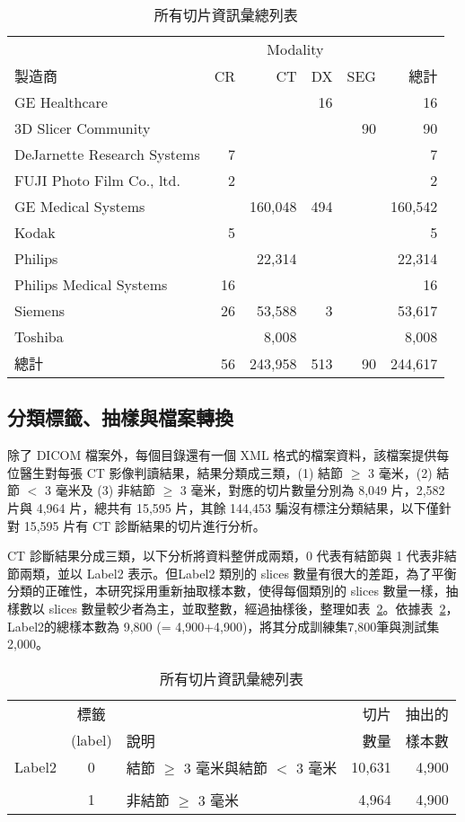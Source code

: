\documentclass[12pt, a4paper]{article} 				%
\begin{document}
\begin{table}[!ht]
\begin{center}
\caption{所有切片資訊彙總列表}\label{Table3-1}
\begin{tabular}{lrrrrr}\toprule
    &\multicolumn{4}{c}{Modality}\\
製造商	&	CR	&	CT	&	DX	&	SEG	&	總計	\\\midrule
GE Healthcare	&		&		&	16	&		&	16	\\
3D Slicer Community	&		&		&		&	90	&	90	\\
DeJarnette Research Systems	&	7	&		&		&		&	7	\\
FUJI Photo Film Co., ltd.	&	2	&		&		&		&	2	\\
GE Medical Systems	&		&	160,048	&	494	&		&	160,542	\\
Kodak	&	5	&		&		&		&	5	\\
Philips	&		&	22,314	&		&		&	22,314	\\
Philips Medical Systems	&	16	&		&		&		&	16	\\
Siemens	&	26	&	53,588	&	3	&		&	53,617	\\
Toshiba	&		&	8,008	&		&		&	8,008	\\
總計	&	56	&	243,958	&	513	&	90	&	244,617	\\\bottomrule
\end{tabular}
\end{center}
\end{table}

\subsection{分類標籤、抽樣與檔案轉換}
除了 DICOM 檔案外，每個目錄還有一個 XML 格式的檔案資料，該檔案提供每位醫生對每張 CT 影像判讀結果，結果分類成三類，(1) 結節 $\ge$ 3 毫米，(2) 結節 $<$ 3 毫米及 (3) 非結節 $\ge$ 3 毫米，對應的切片數量分別為 8,049 片，2,582 片與 4,964 片，總共有 15,595 片，其餘 144,453 騙沒有標注分類結果，以下僅針對 15,595 片有 CT 診斷結果的切片進行分析。

CT 診斷結果分成三類，以下分析將資料整併成兩類，0 代表有結節與 1 代表非結節兩類，並以 Label2 表示。但Label2 類別的 slices 數量有很大的差距，為了平衡分類的正確性，本研究採用重新抽取樣本數，使得每個類別的  slices 數量一樣，抽樣數以 slices 數量較少者為主，並取整數，經過抽樣後，整理如表~\ref{Table3-5}。依據表~\ref{Table3-5}，Label2的總樣本數為 9,800 (= 4,900+4,900)，將其分成訓練集7,800筆與測試集 2,000。

\begin{table}[!ht]
\begin{center}
\caption{所有切片資訊彙總列表}\label{Table3-5}
\begin{tabular}{lclrr}\toprule
	&	標籤&		&	切片	&	抽出的	\\
	&	(label)		&	說明	&	數量	&	樣本數	\\\midrule
Label2	&	0	&	結節 $\ge$ 3 毫米與結節 $<$ 3 毫米	&	10,631	&	4,900	\\
	&		&	 	&		&		\\
	&	1	&	非結節 $\ge$ 3 毫米 	&	4,964	&	4,900	\\ 
\bottomrule
\end{tabular}
\end{center}
\end{table}
\end{document}
